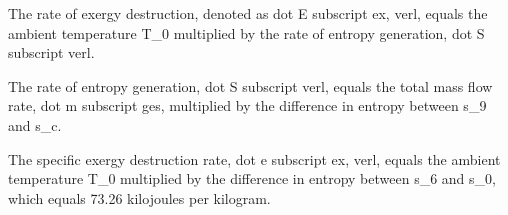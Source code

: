 The rate of exergy destruction, denoted as dot E subscript ex, verl, equals the ambient temperature T_0 multiplied by the rate of entropy generation, dot S subscript verl.

The rate of entropy generation, dot S subscript verl, equals the total mass flow rate, dot m subscript ges, multiplied by the difference in entropy between s_9 and s_c.

The specific exergy destruction rate, dot e subscript ex, verl, equals the ambient temperature T_0 multiplied by the difference in entropy between s_6 and s_0, which equals 73.26 kilojoules per kilogram.